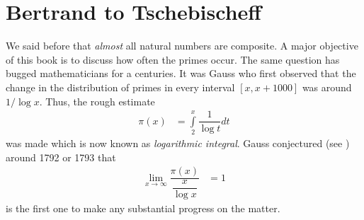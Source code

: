 \documentclass[elemannt.tex]{subfile}
\begin{document}
	\chapter{Bertrand to Tschebischeff}
	We said before that \textit{almost} all natural numbers are composite. A major objective of this book is to discuss how often the primes occur. The same question has bugged mathematicians for a centuries. It was Gauss who first observed that the change in the distribution of primes in every interval $[x,x+1000]$ was around $1/\log{x}$. Thus, the rough estimate
		\begin{align*}
			\pi(x)
				& = \int\limits_{2}^{x}\dfrac{1}{\log{t}}dt
		\end{align*}
	was made which is now known as \textit{logarithmic integral}. Gauss conjectured (see \textcite[Page 37]{landau_1911}) around 1792 or 1793 that
		\begin{align*}
			\lim\limits_{x\to\infty}\dfrac{\pi(x)}{\dfrac{x}{\log{x}}}
				& = 1
		\end{align*}
	\textcite{tchebycheff_1852} is the first one to make any substantial progress on the matter. %
\end{document}
